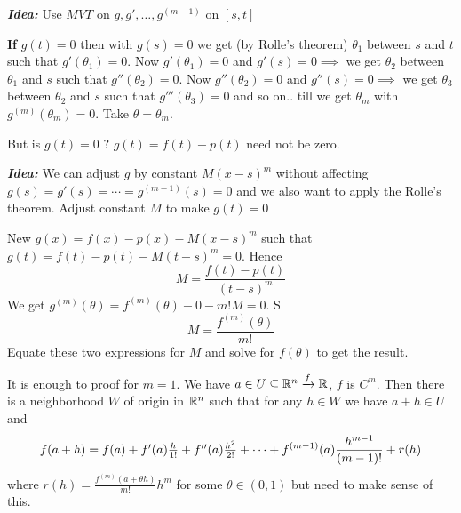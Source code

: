 \textbf{\textit{Idea: }}Use $MVT$ on $g,g',\dots,g^{(m-1)}$ on $[s,t]$\parinn

\textbf{If} $g(t)=0$ then with $g(s)=0$ we get (by Rolle's theorem) $\theta_1$ between $s$ and $t$ such that $g'(\theta_1)=0$. Now $g'(\theta_1)=0$ and $g'(s)=0 \implies$ we get $\theta_2$ between $\theta_1$ and $s$ such that $g''(\theta_2)=0$.   Now $g''(\theta_2)=0$ and $g''(s)=0 \implies$ we get $\theta_3$ between $\theta_2$ and $s$ such that $g'''(\theta_3)=0$ and so on.. till we get $\theta_m$  with $g^{(m)}(\theta_m)=0$. Take $\theta=\theta_m$.

But is $g(t)=0$ ? $g(t)=f(t)-p(t)$ need not be zero.\parinf

\textbf{\textit{Idea:}} We can adjust $g$ by  constant  $M(x-s)^m$ without affecting $g(s)=g'(s)=\cdots =g^{(m-1)}(s)=0$ and we also want  to apply  the Rolle's theorem. Adjust constant $M$ to make $g(t)=0$\parinn

New $g(x)=f(x)-p(x)-M(x-s)^m$ such that $g(t)=f(t)-p(t)-M(t-s)^m=0$. Hence $$M=\frac{f(t)-p(t)}{(t-s)^m}$$We get $g^{(m)}(\theta)=f^{(m)}(\theta)-0-m!M=0$. S $$M=\frac{f^{(m)}(\theta)}{m!}$$Equate these two expressions  for $M$ and solve for $f(\theta)$ to get the result.



It is enough to proof for $m=1$. We have $a\in U\subseteq \mathbb{R}^n\xrightarrow{f}\mathbb{R}$, $f$ is $C^m$. Then there is a neighborhood $W$ of origin in $\mathbb{R}^n$  such that for any $h\in W$  we have $a+h\in U$ and  $$f(a+h)=f(a)+\EqM{c1}{f'(a)\frac{h}{1!}}+\EqM{c2}{f''(a)\frac{h^2}{2!}}+\cdots+f^{(m-1)}(a)\frac{h^{m-1}}{(m-1)!}+r(h)$$ where $r(h)=\frac{f^{(m)}(a+\theta h)}{m!}h^m$ for some $\theta\in (0,1)$ but need to make sense of this.

